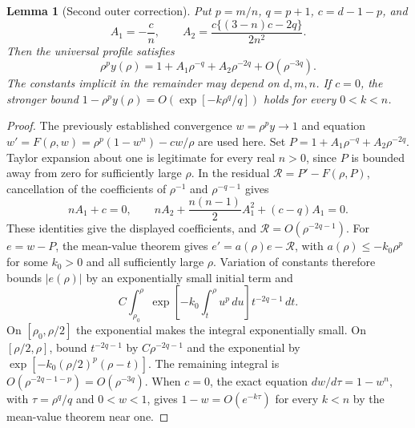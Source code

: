 \documentclass[11pt,a4paper]{article}
\newtheorem{lemma}[theorem]{Lemma}
\theoremstyle{definition}\newtheorem{definition}[theorem]{Definition}
\theoremstyle{remark}\newtheorem{remark}[theorem]{Remark}
\begin{document}
\begin{lemma}[Second outer correction]\label{lem:outersecond}
Put $p=m/n$, $q=p+1$, $c=d-1-p$, and
\[
 A_1=-\frac{c}{n},\qquad
 A_2=\frac{c\{(3-n)c-2q\}}{2n^2}.
\]
Then the universal profile satisfies
\[
 \rho^p y(\rho)
 =1+A_1\rho^{-q}+A_2\rho^{-2q}+O(\rho^{-3q}).
\]
The constants implicit in the remainder may depend on $d,m,n$.
If $c=0$, the stronger bound
$1-\rho^py(\rho)=O(\exp[-k\rho^q/q])$
holds for every $0<k<n$.
\end{lemma}
\begin{proof}
The previously established convergence $w=\rho^py\to1$ and equation
$w'=F(\rho,w)=\rho^p(1-w^n)-cw/\rho$ are used here.
Set $P=1+A_1\rho^{-q}+A_2\rho^{-2q}$. Taylor expansion about one
is legitimate for every real $n>0$, since $P$ is bounded away from zero
for sufficiently large $\rho$. In the residual
$\mathcal R=P'-F(\rho,P)$, cancellation of the coefficients of
$\rho^{-1}$ and $\rho^{-q-1}$ gives
\[
 nA_1+c=0,\qquad
 nA_2+\frac{n(n-1)}2A_1^2+(c-q)A_1=0.
\]
These identities give the displayed coefficients, and
$\mathcal R=O(\rho^{-2q-1})$.
For $e=w-P$, the mean-value theorem gives
$e'=a(\rho)e-\mathcal R$, with $a(\rho)\leq-k_0\rho^p$
for some $k_0>0$ and all sufficiently large $\rho$.
Variation of constants therefore bounds $|e(\rho)|$ by an exponentially
small initial term and
\[
 C\int_{\rho_0}^\rho
 \exp\!\left[-k_0\int_t^\rho u^p\,du\right]t^{-2q-1}\,dt.
\]
On $[\rho_0,\rho/2]$ the exponential makes the integral exponentially
small. On $[\rho/2,\rho]$, bound $t^{-2q-1}$ by
$C\rho^{-2q-1}$ and the exponential by
$\exp[-k_0(\rho/2)^p(\rho-t)]$.
The remaining integral is $O(\rho^{-2q-1-p})=O(\rho^{-3q})$.
When $c=0$, the exact equation $dw/d\tau=1-w^n$, with
$\tau=\rho^q/q$ and $0<w<1$, gives
$1-w=O(e^{-k\tau})$ for every $k<n$ by the mean-value theorem near one.
\end{proof}
\end{document}
